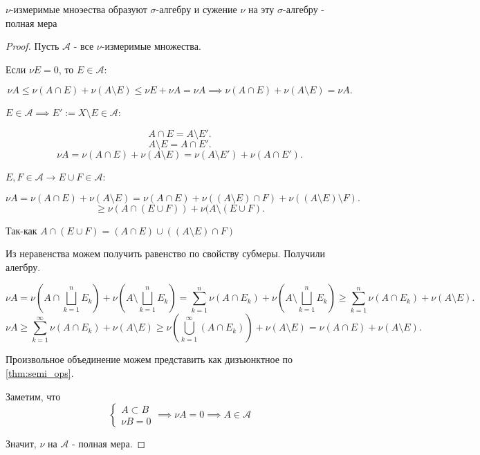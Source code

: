 \begin{theorem}[Каратеодори] \thmslashn

   $\nu$-измеримые мноэества образуют $\sigma$-алгебру и сужение $\nu$ на эту $\sigma$-алгебру - полная мера
   \begin{proof} \thmslashn
       
       Пусть $\mathcal{A}$ - все $\nu$-измеримые множества.

       Если $\nu E = 0$, то $E\in \mathcal{A}$:
    
       \[ \nu A \le \nu(A\cap E) + \nu(A \setminus E) \le \nu E + \nu A = \nu A \implies \nu(A\cap E) + \nu(A \setminus E) = \nu A .\] 

       $E\in \mathcal{A} \implies E' := X \setminus E\in \mathcal{A}$:

       \[ A\cap E = A \setminus E' .\]
       \[ A \setminus E = A\cap E' .\]
       \[ \nu A = \nu (A\cap E) + \nu (A \setminus E) = \nu (A \setminus E') + \nu (A\cap E') .\]

       $E, F\in \mathcal{A} \to  E \cup F\in \mathcal{A}$:

       \[ \nu A = \nu(A\cap E) + \nu(A \setminus E) = \nu(A\cap E) + \nu((A \setminus E)\cap F) + \nu((A \setminus E) \setminus F) .\] 
       \[ \ge \nu(A\cap (E \cup F)) + \nu(A \setminus (E \cup F).\]

       Так-как $A\cap (E \cup F) = (A\cap E) \cup ((A \setminus E)\cap F)$

       Из неравенства можем получить равенство по свойству субмеры. Получили алегбру.

       \[ \nu A = \nu \left( A\cap \bigsqcup\limits_{k=1}^{n} E_{k} \right) + \nu\left(A \setminus \bigsqcup\limits_{k=1}^{n} E_{k}\right) = \sum\limits_{k=1}^{n} \nu(A\cap E_{k}) + \nu\left(A \setminus \bigsqcup\limits_{k=1}^{n} E_{k}\right) \ge \sum\limits_{k=1}^{n} \nu(A\cap E_{k}) + \nu (A \setminus E) .\]
       \[ \nu A \ge \sum\limits_{k=1}^{\infty} \nu(A\cap E_{k}) + \nu(A \setminus E) \ge \nu \left( \bigcup_{k=1}^{\infty} (A\cap E_{k}) \right) + \nu(A \setminus E) = \nu(A\cap E) + \nu(A \setminus E)  .\]

       Произвольное объединение можем представить как дизъюнктное по \autoref{thm:semi_ops}.
        
        Заметим, что 
        \begin{equation*}
            \begin{cases}
                A \subset B\\
                \nu B = 0
            \end{cases} \implies
            \nu A = 0 \implies A\in \mathcal{A}
       \end{equation*}

       Значит, $\nu$ на $\mathcal{A}$ - полная мера.
   \end{proof}
\end{theorem}
